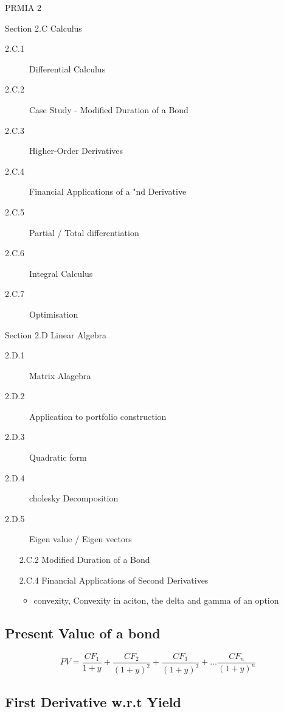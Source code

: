 
PRMIA 2

Section 2.C Calculus

\begin{description}
\item[2.C.1] Differential Calculus
\item[2.C.2] Case Study - Modified Duration of a Bond
\item[2.C.3] Higher-Order Derivatives
\item[2.C.4] Financial Applications of a "nd Derivative
\item[2.C.5] Partial / Total differentiation
\item[2.C.6] Integral Calculus
\item[2.C.7] Optimisation
\end{description}

Section 2.D Linear Algebra
\begin{description}
\item[2.D.1] Matrix Alagebra
\item[2.D.2] Application to portfolio construction
\item[2.D.3] Quadratic form
\item[2.D.4] cholesky Decomposition
\item[2.D.5] Eigen value /  Eigen vectors
\end{description}



\begin{itemize}
\item[2.C.2] Modified Duration of a Bond
\item[2.C.4] Financial Applications of Second Derivatives 
\begin{itemize}
\item convexity, Convexity in aciton, the delta and gamma of an option
\end{itemize}
\end{itemize}

\subsection*{Present Value of a bond}

\[ PV = \frac{CF_1}{1+y} + \frac{CF_2}{(1+y)^2} + \frac{CF_3}{(1+y)^3} + \ldots \frac{CF_n}{(1+y)^n} \]

\subsection*{First Derivative w.r.t Yield}

